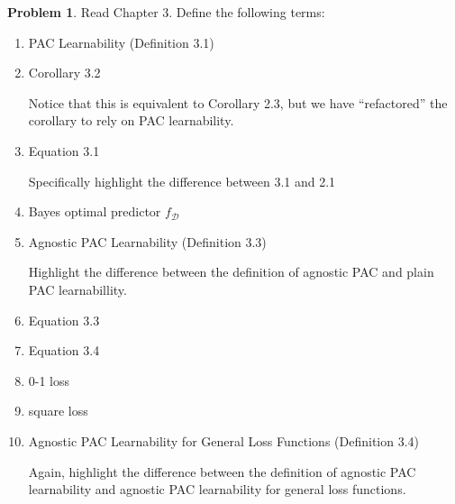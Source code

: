 \documentclass[10pt]{article}
\theoremstyle{definition}
\newtheorem{problem}{Problem}
\begin{document}
\begin{problem}
    Read Chapter 3.
    Define the following terms:
    \begin{enumerate}
        \item PAC Learnability (Definition 3.1)
            \vspace{3in}
        \item Corollary 3.2

            Notice that this is equivalent to Corollary 2.3,
            but we have ``refactored'' the corollary to rely on PAC learnability.
            \vspace{2in}
        \item Equation 3.1 

            Specifically highlight the difference between 3.1 and 2.1
            \vspace{2in}

        \item Bayes optimal predictor $f_{\mathcal D}$
            \vspace{2in}

        \item Agnostic PAC Learnability (Definition 3.3)

            Highlight the difference between the definition of agnostic PAC and plain PAC learnabillity.
            \vspace{2in}

        \item Equation 3.3
            \vspace{2in}
        \item Equation 3.4
            \vspace{2in}

        \item 0-1 loss
            \vspace{2in}
        \item square loss
            \vspace{2in}

        \item Agnostic PAC Learnability for General Loss Functions (Definition 3.4)

            Again, highlight the difference between the definition of agnostic PAC learnability and agnostic PAC learnability for general loss functions.
            \vspace{3in}
    \end{enumerate}
    \vspace{3in}
\end{problem}
\end{document}
